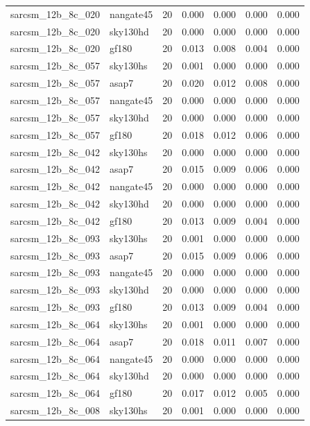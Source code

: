 \begin{tabular}{llrrrrr}
sarcsm\_12b\_8c\_020 & nangate45 & 20 & 0.000 & 0.000 & 0.000 & 0.000 \\
sarcsm\_12b\_8c\_020 & sky130hd & 20 & 0.000 & 0.000 & 0.000 & 0.000 \\
sarcsm\_12b\_8c\_020 & gf180 & 20 & 0.013 & 0.008 & 0.004 & 0.000 \\
sarcsm\_12b\_8c\_057 & sky130hs & 20 & 0.001 & 0.000 & 0.000 & 0.000 \\
sarcsm\_12b\_8c\_057 & asap7 & 20 & 0.020 & 0.012 & 0.008 & 0.000 \\
sarcsm\_12b\_8c\_057 & nangate45 & 20 & 0.000 & 0.000 & 0.000 & 0.000 \\
sarcsm\_12b\_8c\_057 & sky130hd & 20 & 0.000 & 0.000 & 0.000 & 0.000 \\
sarcsm\_12b\_8c\_057 & gf180 & 20 & 0.018 & 0.012 & 0.006 & 0.000 \\
sarcsm\_12b\_8c\_042 & sky130hs & 20 & 0.000 & 0.000 & 0.000 & 0.000 \\
sarcsm\_12b\_8c\_042 & asap7 & 20 & 0.015 & 0.009 & 0.006 & 0.000 \\
sarcsm\_12b\_8c\_042 & nangate45 & 20 & 0.000 & 0.000 & 0.000 & 0.000 \\
sarcsm\_12b\_8c\_042 & sky130hd & 20 & 0.000 & 0.000 & 0.000 & 0.000 \\
sarcsm\_12b\_8c\_042 & gf180 & 20 & 0.013 & 0.009 & 0.004 & 0.000 \\
sarcsm\_12b\_8c\_093 & sky130hs & 20 & 0.001 & 0.000 & 0.000 & 0.000 \\
sarcsm\_12b\_8c\_093 & asap7 & 20 & 0.015 & 0.009 & 0.006 & 0.000 \\
sarcsm\_12b\_8c\_093 & nangate45 & 20 & 0.000 & 0.000 & 0.000 & 0.000 \\
sarcsm\_12b\_8c\_093 & sky130hd & 20 & 0.000 & 0.000 & 0.000 & 0.000 \\
sarcsm\_12b\_8c\_093 & gf180 & 20 & 0.013 & 0.009 & 0.004 & 0.000 \\
sarcsm\_12b\_8c\_064 & sky130hs & 20 & 0.001 & 0.000 & 0.000 & 0.000 \\
sarcsm\_12b\_8c\_064 & asap7 & 20 & 0.018 & 0.011 & 0.007 & 0.000 \\
sarcsm\_12b\_8c\_064 & nangate45 & 20 & 0.000 & 0.000 & 0.000 & 0.000 \\
sarcsm\_12b\_8c\_064 & sky130hd & 20 & 0.000 & 0.000 & 0.000 & 0.000 \\
sarcsm\_12b\_8c\_064 & gf180 & 20 & 0.017 & 0.012 & 0.005 & 0.000 \\
sarcsm\_12b\_8c\_008 & sky130hs & 20 & 0.001 & 0.000 & 0.000 & 0.000 \\

\end{tabular}
